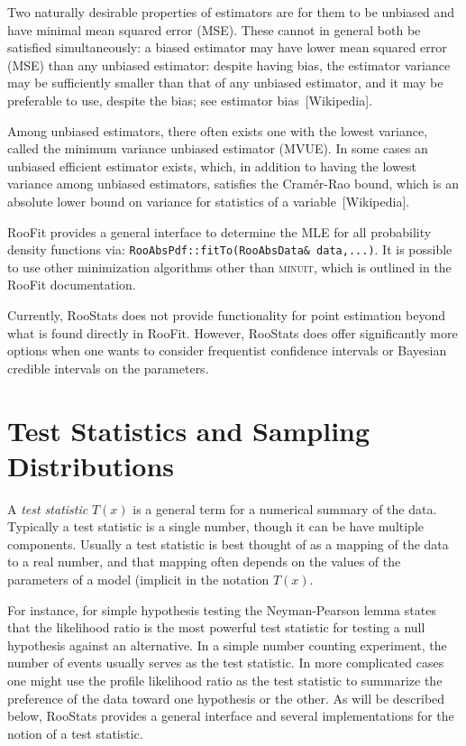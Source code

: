 \documentclass[11pt]{article}
\begin{document}
Two naturally desirable properties of estimators are for them to be unbiased and have minimal mean squared error (MSE). These cannot in general both be satisfied simultaneously: a biased estimator may have lower mean squared error (MSE) than any unbiased estimator: despite having bias, the estimator variance may be sufficiently smaller than that of any unbiased estimator, and it may be preferable to use, despite the bias; see estimator bias~[Wikipedia].

Among unbiased estimators, there often exists one with the lowest variance, called the minimum variance unbiased estimator (MVUE). In some cases an unbiased efficient estimator exists, which, in addition to having the lowest variance among unbiased estimators, satisfies the Cram\'er-Rao bound, which is an absolute lower bound on variance for statistics of a variable~[Wikipedia].

RooFit provides a general interface to determine the MLE for all probability density functions via: \texttt{RooAbsPdf::fitTo(RooAbsData\& data,...)}.  It is possible to use other minimization algorithms other than \textsc{minuit}, which is outlined in the RooFit documentation.

Currently, RooStats does not provide functionality for point estimation beyond what is found directly in RooFit.  However, RooStats does offer significantly more options when one wants to consider frequentist confidence intervals or Bayesian credible intervals on the parameters.


\section{Test Statistics and Sampling Distributions}\label{S:TestStat}

A \textit{test statistic} $T(x)$ is a general term for a numerical summary of the data.  Typically a test statistic is a single number, though it can be have multiple components.  Usually a test statistic is best thought of as a mapping of the data to a real number, and that mapping often depends on the values of the parameters of a model (implicit in the notation $T(x)$.  

For instance, for simple hypothesis testing the Neyman-Pearson lemma states that the likelihood ratio is the most powerful test statistic for testing a null hypothesis against an alternative.  In a simple number counting experiment, the number of events usually serves as the test statistic.  In more complicated cases one might use the profile likelihood ratio as the test statistic to summarize the preference of the data toward one hypothesis or the other.  As will be described below, RooStats provides a general interface and several implementations for the notion of a test statistic.
\end{document}
